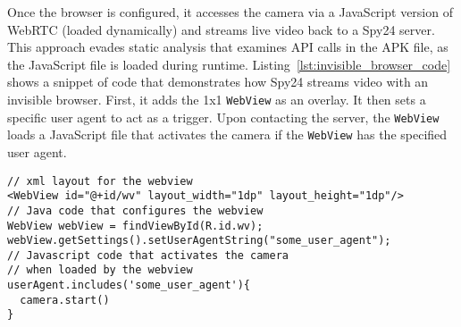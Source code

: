Once the browser is configured, it accesses the camera via a JavaScript version
of WebRTC (loaded dynamically) and streams live video back to a Spy24 server.
This approach evades static analysis that examines API calls in the APK file, as
the JavaScript file is loaded during runtime.
Listing~\ref{lst:invisible_browser_code} shows a snippet of code that
demonstrates how Spy24 streams video with an invisible browser. First, it adds the 1x1 \texttt{WebView} as an overlay.  It then sets a specific user
agent to act as a trigger. Upon contacting the server, the \texttt{WebView} loads a
JavaScript file that activates the camera if the \texttt{WebView} has the specified user
agent.

\begin{lstlisting}[basicstyle=\small\ttfamily,caption={Code snippet that demonstrates how Spy24 streams live video.},label={lst:invisible_browser_code},captionpos=b,float=t]
// xml layout for the webview
<WebView id="@+id/wv" layout_width="1dp" layout_height="1dp"/>
// Java code that configures the webview
WebView webView = findViewById(R.id.wv);
webView.getSettings().setUserAgentString("some_user_agent");
// Javascript code that activates the camera 
// when loaded by the webview
userAgent.includes('some_user_agent'){
  camera.start()
}
\end{lstlisting}




